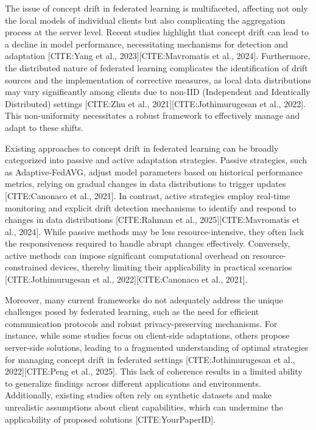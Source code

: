 \documentclass[journal]{IEEEtran}
\begin{document}
The issue of concept drift in federated learning is multifaceted, affecting not only the local models of individual clients but also complicating the aggregation process at the server level. Recent studies highlight that concept drift can lead to a decline in model performance, necessitating mechanisms for detection and adaptation [CITE:Yang et al., 2023][CITE:Mavromatis et al., 2024]. Furthermore, the distributed nature of federated learning complicates the identification of drift sources and the implementation of corrective measures, as local data distributions may vary significantly among clients due to non-IID (Independent and Identically Distributed) settings [CITE:Zhu et al., 2021][CITE:Jothimurugesan et al., 2022]. This non-uniformity necessitates a robust framework to effectively manage and adapt to these shifts.

Existing approaches to concept drift in federated learning can be broadly categorized into passive and active adaptation strategies. Passive strategies, such as Adaptive-FedAVG, adjust model parameters based on historical performance metrics, relying on gradual changes in data distributions to trigger updates [CITE:Canonaco et al., 2021]. In contrast, active strategies employ real-time monitoring and explicit drift detection mechanisms to identify and respond to changes in data distributions [CITE:Rahman et al., 2025][CITE:Mavromatis et al., 2024]. While passive methods may be less resource-intensive, they often lack the responsiveness required to handle abrupt changes effectively. Conversely, active methods can impose significant computational overhead on resource-constrained devices, thereby limiting their applicability in practical scenarios [CITE:Jothimurugesan et al., 2022][CITE:Canonaco et al., 2021].

Moreover, many current frameworks do not adequately address the unique challenges posed by federated learning, such as the need for efficient communication protocols and robust privacy-preserving mechanisms. For instance, while some studies focus on client-side adaptations, others propose server-side solutions, leading to a fragmented understanding of optimal strategies for managing concept drift in federated settings [CITE:Jothimurugesan et al., 2022][CITE:Peng et al., 2025]. This lack of coherence results in a limited ability to generalize findings across different applications and environments. Additionally, existing studies often rely on synthetic datasets and make unrealistic assumptions about client capabilities, which can undermine the applicability of proposed solutions [CITE:YourPaperID].
\end{document}
